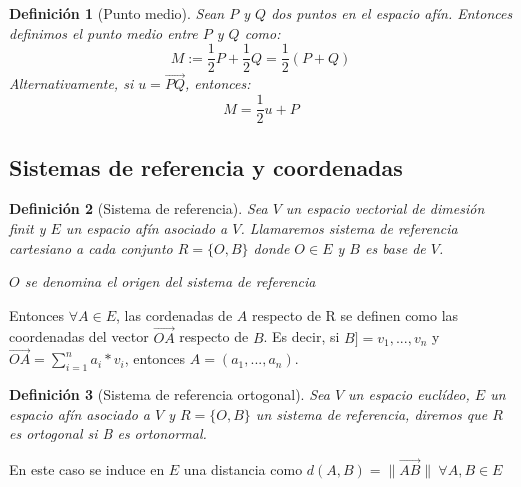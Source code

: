\documentclass[11pt, a4paper]{article}
\newif\IfInSansMode
\renewcommand{\vec}{\overrightarrow}
\theoremstyle{theorem-style}
\newtheorem{nth}{Teorema}[section]
\theoremstyle{definition-style}
\newtheorem{ndef}{Definición}[section]
\theoremstyle{remark-style}
\theoremstyle{example-style}
\begin{document}
\begin{ndef}[Punto medio]
  Sean $P$ y $Q$ dos puntos en el espacio afín. Entonces definimos el punto medio entre $P$ y $Q$ como:
  \[
    M := \dfrac{1}{2} P + \dfrac{1}{2}Q = \dfrac{1}{2}(P+Q)
  \]
  Alternativamente, si $u = \overrightarrow{PQ}$, entonces:
  \[
    M = \dfrac{1}{2}u + P
  \]

\end{ndef}

\subsection{Sistemas de referencia y coordenadas}

\begin{ndef}[Sistema de referencia]
Sea $V$ un espacio vectorial de dimesión finit y $E$ un espacio afín asociado a $V$. Llamaremos \textit{ sistema de referencia cartesiano } a cada conjunto $R=\{O,B\}$ donde $O\in E$ y $B$ es base de $V$.

$O$ se denomina el origen del sistema de referencia 

\end{ndef}

Entonces $\forall A \in E$, las cordenadas de $A$ respecto de R se definen como las coordenadas del vector $\vec{OA}$ respecto de $B$. Es decir, si $B] = v_1, ... ,v_n $ y $\vec{OA} = \sum_{i=1}^{n} a_i*v_i$, entonces $A = (a_1,..., a_n)$.

\begin{ndef}[Sistema de referencia ortogonal]
Sea $V$ un espacio euclídeo, $E$ un espacio afín asociado a $V$ y $R=\{O,B\}$ un sistema de referencia, diremos que $R$ es ortogonal si B es ortonormal.

\end{ndef}

En este caso se induce en $E$ una distancia como $d(A,B) = \|\vec{AB}\|\ \forall A,B \in E$ 



\end{document}
